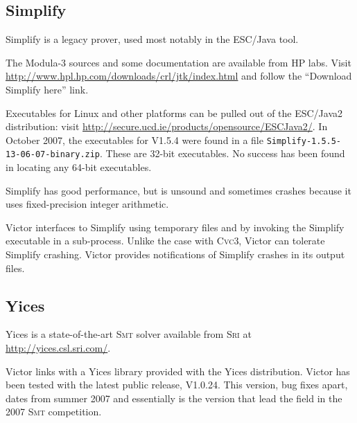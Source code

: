 \documentclass[12pt,fleqn]{article}
\newcommand{\cvcthree}{\textsc{Cvc}3}
\newcommand{\yices}{Yices}
\newcommand{\smt}{\textsc{Smt}}
\newcommand{\sri}{\textsc{Sri}}
\begin{document}
\subsection{Simplify}

Simplify is a legacy prover, used most notably in the ESC/Java tool. 

The Modula-3 sources and some documentation are available from HP labs.
Visit \url{http://www.hpl.hp.com/downloads/crl/jtk/index.html} and follow
the ``Download Simplify here'' link.

Executables for Linux and other platforms can be pulled out of the
ESC/Java2 distribution: visit
\url{http://secure.ucd.ie/products/opensource/ESCJava2/}.
In October 2007, the executables for V1.5.4 were found in a file 
\texttt{Simplify-1.5.5-13-06-07-binary.zip}.  These are 32-bit executables.
No success has been found in locating any 64-bit executables. 

Simplify has good performance, but is unsound and sometimes crashes
because it uses fixed-precision integer arithmetic.

Victor interfaces to Simplify using temporary files and by invoking
the Simplify executable in a sub-process.  Unlike the case with
\cvcthree{}, Victor can tolerate Simplify crashing.  Victor provides
notifications of Simplify crashes in its output files.


\subsection{Yices}

\yices{} is a state-of-the-art \smt{} solver available from \sri{} at
\url{http://yices.csl.sri.com/}.

Victor links with a \yices{} library provided with the \yices{}
distribution.  Victor has been tested with the latest public release,
V1.0.24.  This version, bug fixes apart, dates from summer 2007 and
essentially is the version that lead the field in the 2007 \smt{}
competition. 

\end{document}
